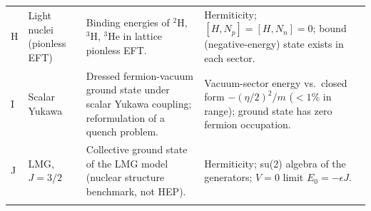 \begin{tabular}{@{}llp{}p{}@{}}
H & Light nuclei (pionless EFT) & Binding energies of $^2$H, $^3$H, $^3$He in lattice pionless EFT. & Hermiticity; $[H,N_p]=[H,N_n]=0$; bound (negative-energy) state exists in each sector. \\
I & Scalar Yukawa & Dressed fermion-vacuum ground state under scalar Yukawa coupling; reformulation of a quench problem. & Vacuum-sector energy vs.\ closed form $-(\eta/2)^2/m$ ($<1\%$ in range); ground state has zero fermion occupation. \\
J & LMG, $J{=}3/2$ & Collective ground state of the LMG model (nuclear structure benchmark, not HEP). & Hermiticity; su(2) algebra of the generators; $V{=}0$ limit $E_0=-\epsilon J$. \\
\botrule
\end{tabular}
